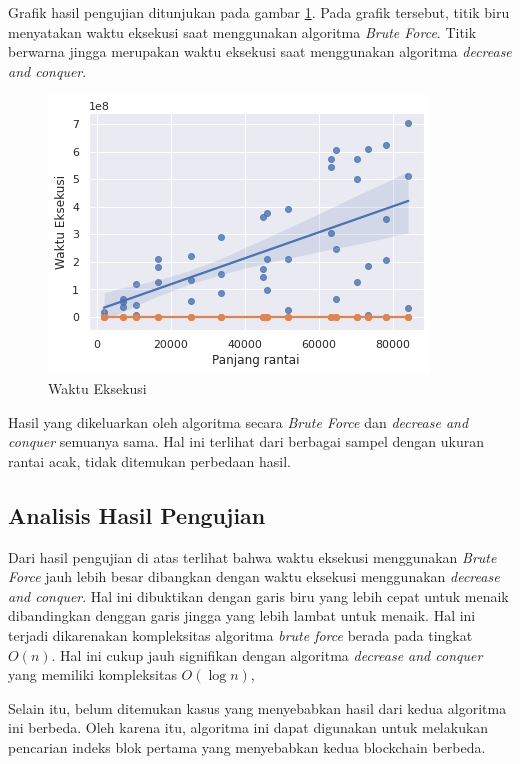 \documentclass[10pt,conference]{IEEEtran}
\theoremstyle{definition}
\begin{document}
\vspace{8px}

Grafik hasil pengujian ditunjukan pada gambar \ref{fig:grafik}. Pada grafik tersebut, titik biru menyatakan waktu eksekusi saat menggunakan algoritma \emph{Brute Force}. Titik berwarna jingga merupakan waktu eksekusi saat menggunakan algoritma  \emph{decrease and conquer}.

\begin{figure}[htbp]
    \centerline{\includegraphics[width=0.9\columnwidth]{grafik.png}}
    \caption{Waktu Eksekusi}
    \label{fig:grafik}
\end{figure}

Hasil yang dikeluarkan oleh algoritma secara \emph{Brute Force}  dan \emph{decrease and conquer} semuanya sama. Hal ini terlihat dari berbagai sampel dengan ukuran rantai acak, tidak ditemukan perbedaan hasil.


\subsection{Analisis Hasil Pengujian}
Dari hasil pengujian di atas terlihat bahwa waktu eksekusi menggunakan \emph{Brute Force} jauh lebih besar dibangkan dengan waktu eksekusi menggunakan \emph{decrease and conquer}. Hal ini dibuktikan dengan garis biru yang lebih cepat untuk menaik dibandingkan denggan garis jingga yang lebih lambat untuk menaik. Hal ini terjadi dikarenakan kompleksitas algoritma \emph{brute force} berada pada tingkat $O(n)$. Hal ini cukup jauh signifikan dengan algoritma \emph{decrease and conquer} yang memiliki kompleksitas $O(\log n)$, 

Selain itu, belum ditemukan kasus yang menyebabkan hasil dari kedua algoritma ini berbeda. Oleh karena itu, algoritma ini dapat digunakan untuk melakukan pencarian indeks blok pertama yang menyebabkan kedua blockchain berbeda.
\end{document}
